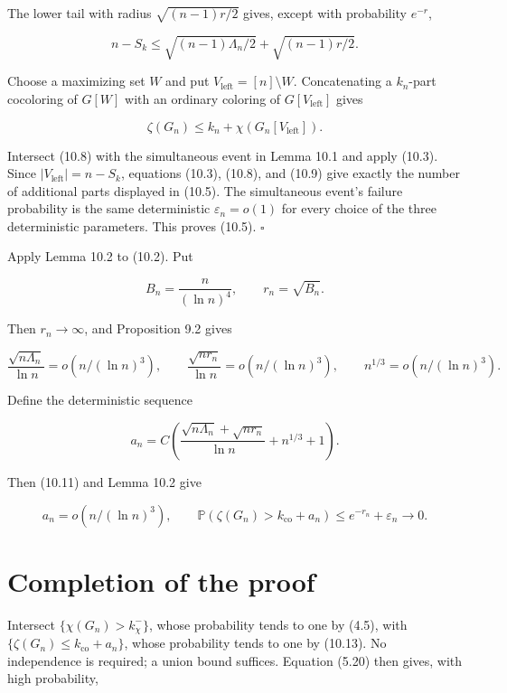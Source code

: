 \documentclass[11pt,reqno]{amsart}
\newcommand{\Prob}[1]{\mathbb{P}\!\left(#1\right)}
\begin{document}
The lower tail with radius \(\sqrt{(n-1)r/2}\) gives, except with
probability \(e^{-r}\),

\[
 n-S_k\le
 \sqrt{(n-1)\Lambda_n/2}+\sqrt{(n-1)r/2}.                \tag{10.8}
\]

Choose a maximizing set \(W\) and put
\(V_{\mathrm{left}}=[n]\setminus W\). Concatenating a
\(k_n\)-part cocoloring of \(G[W]\) with an ordinary
coloring of \(G[V_{\mathrm{left}}]\) gives

\[
 \zeta(G_n)\le k_n+\chi(G_n[V_{\mathrm{left}}]).         \tag{10.9}
\]

Intersect (10.8) with the simultaneous event in Lemma 10.1 and apply
(10.3).  Since \(|V_{\mathrm{left}}|=n-S_k\), equations (10.3), (10.8), and (10.9)
give exactly the number of additional parts displayed in (10.5).
The simultaneous event's failure probability is the same deterministic
\(\varepsilon_n=o(1)\) for every choice of the three deterministic
parameters. This proves (10.5). \(\square\)

Apply Lemma 10.2 to (10.2). Put

\[
 B_n=\frac n{(\ln n)^4},\qquad r_n=\sqrt{B_n}.                 \tag{10.10}
\]

Then \(r_n\to\infty\), and Proposition 9.2 gives

\[
 \frac{\sqrt{n\Lambda_n}}{\ln n}=o(n/(\ln n)^3),\qquad
 \frac{\sqrt{nr_n}}{\ln n}=o(n/(\ln n)^3),\qquad
 n^{1/3}=o(n/(\ln n)^3).                                       \tag{10.11}
\]

Define the deterministic sequence

\[
 a_n=C\left(
 \frac{\sqrt{n\Lambda_n}+\sqrt{nr_n}}{\ln n}+n^{1/3}+1\right).
                                                               \tag{10.12}
\]

Then (10.11) and Lemma 10.2 give

\[
 a_n=o(n/(\ln n)^3),\qquad
 \Prob{\zeta(G_n)>k_{\mathrm{co}}+a_n}
 \le e^{-r_n}+\varepsilon_n\longrightarrow0.            \tag{10.13}
\]

\section{Completion of the proof}\label{completion-of-the-proof}

Intersect \(\{\chi(G_n)>k_\chi^-\}\), whose probability tends to one by
(4.5), with \(\{\zeta(G_n)\le k_{\mathrm{co}}+a_n\}\), whose probability tends to
one by (10.13). No independence is required; a union bound suffices.
Equation (5.20) then gives, with high probability,
\end{document}
